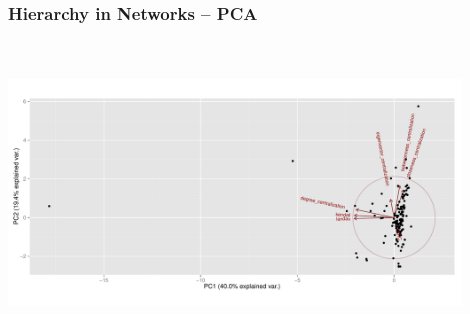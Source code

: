 \documentclass[xcolor={table}]{beamer}
\newenvironment{changemargin}[2]{%
  \begin{list}{}{%
    \setlength{\topsep}{0pt}%
    \setlength{\leftmargin}{#1}%
    \setlength{\rightmargin}{#2}%
    \setlength{\listparindent}{\parindent}%
    \setlength{\itemindent}{\parindent}%
    \setlength{\parsep}{\parskip}%
  }%
  \item[]}{\end{list}}
\begin{document}
\begin{frame}\frametitle{Hierarchy in Networks -- PCA}
	\begin{changemargin}{-2cm}{ -2cm}
		\centering
		\includegraphics[width=12cm, height=8cm]{images/PCA_Plot.pdf}
	\end{changemargin}
\end{frame}
\end{document}
